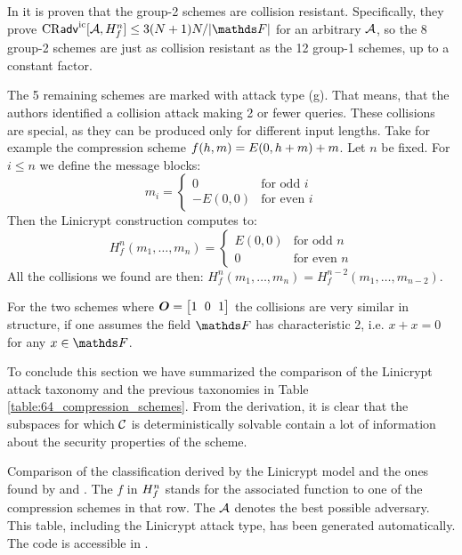 In \cite{C:BlaRogShr02} it is proven that the group-2 schemes are collision resistant.
Specifically, they prove $\cradv{\A, H^n_f} \leq 3(N+1)N / |\F|$ for an arbitrary $\mathcal{A}$,
so the 8 group-2 schemes are just as collision resistant as the 12 group-1 schemes, up to a constant factor.

The 5 remaining schemes are marked with attack type (g).
That means, that the authors \cite{C:BlaRogShr02} identified a collision attack making 2 or fewer queries.
These collisions are special, as they can be produced only for different input lengths.
Take for example the compression scheme $f(h,m) = E(0,h+m) + m$.
Let $n$ be fixed.
For $i \leq n$ we define the message blocks:
\[
m_i = \begin{cases}
0 & \textrm{for odd $i$} \\
-E(0,0) & \textrm{for even $i$}
\end{cases}
\]
Then the Linicrypt \MD construction computes to:
\[
H_f^n(m_1, \dots, m_n) = \begin{cases}
E(0,0) & \textrm{for odd $n$} \\
0 & \textrm{for even $n$}
\end{cases}
\]
All the collisions we found are then: $H^n_f(m_1, \dots, m_n) = H^{n-2}_f(m_1, \dots, m_{n-2})$.

For the two schemes where $\O = \m{1&0&1}$ the collisions are very similar in structure,
if one assumes the field $\F$ has characteristic 2, i.e. $x + x = 0$ for any $x \in \F$.

\begin{center}
\end{center}

To conclude this section we have summarized the comparison of the Linicrypt attack taxonomy and the previous taxonomies in Table \ref{table:64_compression_schemes}.
From the derivation, it is clear that the subspaces for which $\mathcal{C}$ is deterministically solvable
contain a lot of information about the security properties of the scheme.

\begin{table}[ht]
\centering
\renewcommand{\arraystretch}{1.2}

\caption{
    Comparison of the classification derived by the Linicrypt model and the ones found by \cite{C:PreGovVan93} and \cite{C:BlaRogShr02}.
    The $f$ in $H^n_{f}$ stands for the associated function to one of the compression schemes in that row.
    The $\mathcal{A}$ denotes the best possible adversary.
    This table, including the Linicrypt attack type, has been generated automatically.
    The code is accessible in \cite{Semmel_Code_for_Modeling_2022}.
    }
\label{table:64_compression_schemes}
\end{table}

